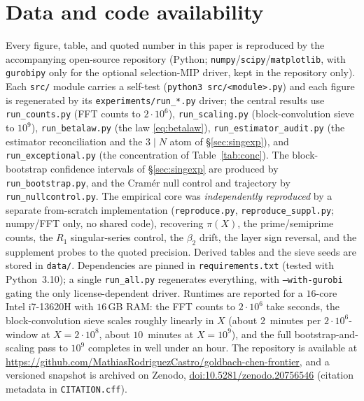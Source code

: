 \documentclass[]{interact}%
\begin{document}
\section*{Data and code availability}
\label{sec:availability}
Every figure, table, and quoted number in this paper is reproduced by the accompanying
open-source repository (Python; \texttt{numpy}/\texttt{scipy}/\texttt{matplotlib}, with
\texttt{gurobipy} only for the optional selection-MIP driver, kept in the repository only). Each
\texttt{src/} module carries a self-test (\texttt{python3 src/<module>.py}) and each
figure is regenerated by its \texttt{experiments/run\_*.py} driver; the central results
use \texttt{run\_counts.py} (FFT counts to $2\cdot10^{6}$), \texttt{run\_scaling.py}
(block-convolution sieve to $10^{9}$), \texttt{run\_betalaw.py} (the law
\eqref{eq:betalaw}), \texttt{run\_estimator\_audit.py} (the estimator reconciliation and
the $3\mid N$ atom of \S\ref{sec:singexp}), and \texttt{run\_exceptional.py} (the
concentration of Table~\ref{tab:conc}). The block-bootstrap confidence intervals of
\S\ref{sec:singexp} are produced by \texttt{run\_bootstrap.py}, and the Cram\'er null control and
trajectory by \texttt{run\_nullcontrol.py}. The empirical core was \emph{independently reproduced}
by a separate from-scratch implementation (\texttt{reproduce.py}, \texttt{reproduce\_suppl.py};
numpy/FFT only, no shared code), recovering $\pi(X)$, the prime/semiprime counts, the $R_1$
singular-series control, the $\beta_2$ drift, the layer sign reversal, and the supplement probes to
the quoted precision. Derived tables and the sieve seeds are stored in \texttt{data/}. Dependencies are pinned in \texttt{requirements.txt}
(tested with Python~3.10); a single \texttt{run\_all.py} regenerates everything, with
\texttt{--with-gurobi} gating the only license-dependent driver. Runtimes are reported for a
$16$-core Intel i7-13620H with $16$\,GB RAM: the FFT counts to $2\cdot10^{6}$ take seconds, the
block-convolution sieve scales roughly linearly in $X$ (about $2$~minutes per
$2\cdot10^{6}$-window at $X=2\cdot10^{8}$, about $10$~minutes at $X=10^{9}$), and the full
bootstrap-and-scaling pass to $10^{9}$ completes in well under an hour. The repository is
available at
\url{https://github.com/MathiasRodriguezCastro/goldbach-chen-frontier}, and a versioned
snapshot is archived on Zenodo,
\href{https://doi.org/10.5281/zenodo.20756546}{doi:10.5281/zenodo.20756546} (citation
metadata in \texttt{CITATION.cff}).
\end{document}
